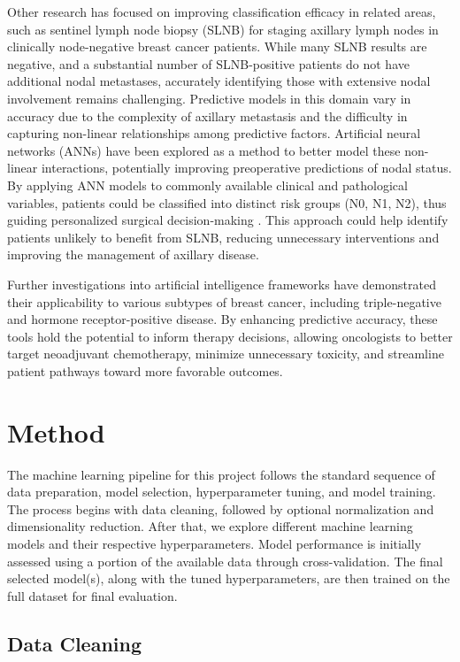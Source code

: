 \documentclass{article}
\begin{document}
Other research has focused on improving classification efficacy in related areas, such as sentinel lymph node biopsy (SLNB) for staging axillary lymph nodes in clinically node-negative breast cancer patients. While many SLNB results are negative, and a substantial number of SLNB-positive patients do not have additional nodal metastases, accurately identifying those with extensive nodal involvement remains challenging. Predictive models in this domain vary in accuracy due to the complexity of axillary metastasis and the difficulty in capturing non-linear relationships among predictive factors. Artificial neural networks (ANNs) have been explored as a method to better model these non-linear interactions, potentially improving preoperative predictions of nodal status. By applying ANN models to commonly available clinical and pathological variables, patients could be classified into distinct risk groups (N0, N1, N2), thus guiding personalized surgical decision-making \cite{Dihge2019}. This approach could help identify patients unlikely to benefit from SLNB, reducing unnecessary interventions and improving the management of axillary disease.

Further investigations into artificial intelligence frameworks have demonstrated their applicability to various subtypes of breast cancer, including triple-negative and hormone receptor-positive disease. By enhancing predictive accuracy, these tools hold the potential to inform therapy decisions, allowing oncologists to better target neoadjuvant chemotherapy, minimize unnecessary toxicity, and streamline patient pathways toward more favorable outcomes.

\section{Method}

The machine learning pipeline for this project follows the standard sequence of data preparation, model selection, hyperparameter tuning, and model training. The process begins with data cleaning, followed by optional normalization and dimensionality reduction. After that, we explore different machine learning models and their respective hyperparameters. Model performance is initially assessed using a portion of the available data through cross-validation. The final selected model(s), along with the tuned hyperparameters, are then trained on the full dataset for final evaluation.

\subsection{Data Cleaning}
\end{document}
